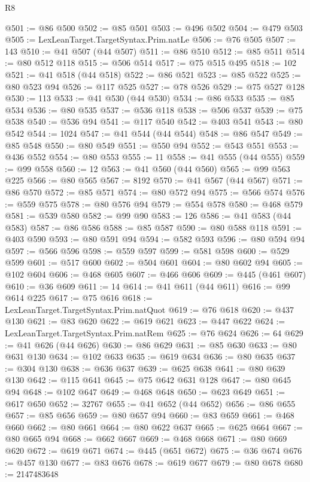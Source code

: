 \begin{lexlean}{R8}
\begin{coremodule}
@501 := @86 @500
@502 := @85 @501
@503 := @496 @502
@504 := @479 @503
@505 := LexLeanTarget.TargetSyntax.Prim.natLe
@506 := @76 @505
@507 := 143
@510 := @41 @507 (@44 @507)
@511 := @86 @510
@512 := @85 @511
@514 := @80 @512 @118
@515 := @506 @514
@517 := @75 @515 @495
@518 := 102
@521 := @41 @518 (@44 @518)
@522 := @86 @521
@523 := @85 @522
@525 := @80 @523 @94
@526 := @117 @525
@527 := @78 @526
@529 := @75 @527 @128
@530 := 113
@533 := @41 @530 (@44 @530)
@534 := @86 @533
@535 := @85 @534
@536 := @80 @535
@537 := @536 @118
@538 := @506 @537
@539 := @75 @538
@540 := @536 @94
@541 := @117 @540
@542 := @403 @541
@543 := @80 @542
@544 := 1024
@547 := @41 @544 (@44 @544)
@548 := @86 @547
@549 := @85 @548
@550 := @80 @549
@551 := @550 @94
@552 := @543 @551
@553 := @436 @552
@554 := @80 @553
@555 := 11
@558 := @41 @555 (@44 @555)
@559 := @99 @558
@560 := 12
@563 := @41 @560 (@44 @560)
@565 := @99 @563 @225
@566 := @80 @565
@567 := 8192
@570 := @41 @567 (@44 @567)
@571 := @86 @570
@572 := @85 @571
@574 := @80 @572 @94
@575 := @566 @574
@576 := @559 @575
@578 := @80 @576 @94
@579 := @554 @578
@580 := @468 @579
@581 := @539 @580
@582 := @99 @90
@583 := 126
@586 := @41 @583 (@44 @583)
@587 := @86 @586
@588 := @85 @587
@590 := @80 @588 @118
@591 := @403 @590
@593 := @80 @591 @94
@594 := @582 @593
@596 := @80 @594 @94
@597 := @566 @596
@598 := @559 @597
@599 := @581 @598
@600 := @529 @599
@601 := @517 @600
@602 := @504 @601
@604 := @80 @602 @94
@605 := @102 @604
@606 := @468 @605
@607 := @466 @606
@609 := @445 (@461 @607)
@610 := @36 @609
@611 := 14
@614 := @41 @611 (@44 @611)
@616 := @99 @614 @225
@617 := @75 @616
@618 := LexLeanTarget.TargetSyntax.Prim.natQuot
@619 := @76 @618
@620 := @437 @130
@621 := @83 @620
@622 := @619 @621
@623 := @447 @622
@624 := LexLeanTarget.TargetSyntax.Prim.natRem
@625 := @76 @624
@626 := 64
@629 := @41 @626 (@44 @626)
@630 := @86 @629
@631 := @85 @630
@633 := @80 @631 @130
@634 := @102 @633
@635 := @619 @634
@636 := @80 @635
@637 := @304 @130
@638 := @636 @637
@639 := @625 @638
@641 := @80 @639 @130
@642 := @115 @641
@645 := @75 @642 @631 @128
@647 := @80 @645 @94
@648 := @102 @647
@649 := @468 @648
@650 := @623 @649
@651 := @617 @650
@652 := 32767
@655 := @41 @652 (@44 @652)
@656 := @86 @655
@657 := @85 @656
@659 := @80 @657 @94
@660 := @83 @659
@661 := @468 @660
@662 := @80 @661
@664 := @80 @622 @637
@665 := @625 @664
@667 := @80 @665 @94
@668 := @662 @667
@669 := @468 @668
@671 := @80 @669 @620
@672 := @619 @671
@674 := @445 (@651 @672)
@675 := @36 @674
@676 := @457 @130
@677 := @83 @676
@678 := @619 @677
@679 := @80 @678
@680 := 2147483648

\end{coremodule}
\end{lexlean}
